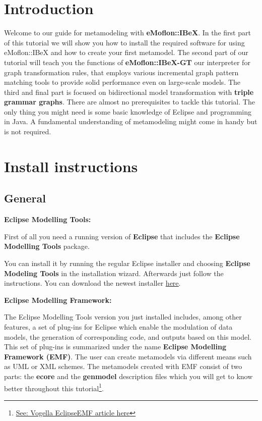 \section{Introduction}
Welcome to our guide for metamodeling with \textbf{eMoflon::IBeX}. In the first part of this tutorial we will show you how to install the required software for using eMoflon::IBeX and how to create your first metamodel.\newline
The second part of our tutorial will teach you the functions of \textbf{eMoflon::IBeX-GT} our interpreter for graph transformation rules, that employs various incremental graph pattern matching tools to provide solid performance even on large-scale models.\newline
The third and final part is focused on bidirectional model transformation with \textbf{triple grammar graphs}.\newline
There are almost no prerequisites to tackle this tutorial. The only thing you might need is some basic knowledge of Eclipse and programming in Java. A fundamental understanding of metamodeling might come in handy but is not required. 

\section{Install instructions}

\raggedright

\subsection{General}

\textbf{Eclipse Modelling Tools:}

First of all you need a running version of \textbf{Eclipse} that includes the \textbf{Eclipse Modelling Tools} package.

You can install it by running the regular Eclipse installer and choosing \textbf{Eclipse Modeling Tools} in the installation wizard. Afterwards just follow the instructions.\newline
You can download the newest installer \underline{\href{https://www.eclipse.org/downloads/}{here}}.\newline

\textbf{Eclipse Modelling Framework:}

The Eclipse Modelling Tools version you just installed includes, among other features, a set of plug-ins for Eclipse which enable the modulation of data models, the generation of corresponding code, and outputs based on this model.\newline
This set of plug-ins is summarized under the name \textbf{Eclipse Modelling Framework (EMF)}.\newline
The user can create metamodels via different means such as UML or XML schemes. The metamodels created with EMF consist of two parts: the \textbf{ecore} and the \textbf{genmodel} description files which you will get to know better throughout this tutorial\footnote{\href{https://www.vogella.com/tutorials/EclipseEMF/article.html}{See: Vogella EclipseEMF article \underline{here}}}.

